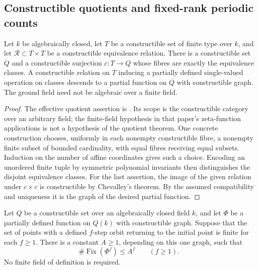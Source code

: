 \subsection{Constructible quotients and fixed-rank periodic counts}

\begin{lemma}
\label{D:effective-constructible-quotient}
Let \(k\) be algebraically closed, let \(T\) be a constructible set
of finite type over \(k\), and let \(\mathcal R\subset T\times T\)
be a constructible equivalence relation. There is a constructible
set \(Q\) and a constructible surjection \(c:T\to Q\) whose fibres
are exactly the equivalence classes. A constructible relation
on \(T\) inducing a partially defined single-valued operation on
classes descends to a partial function on \(Q\) with constructible
graph. The ground field need not be algebraic over a finite field.
\end{lemma}

\begin{proof}
The effective quotient assertion is
\cite[Theorem 2; constructive proof by Proposition 3.1, pp.~10--11]
{Beke2011FixedRankB}. Its scope is the constructible category over
an arbitrary field; the finite-field hypothesis in that paper's
zeta-function applications is not a hypothesis of the quotient
theorem. One concrete construction chooses, uniformly in each
nonempty constructible fibre, a nonempty finite subset of bounded
cardinality, with equal fibres receiving equal subsets. Induction
on the number of affine coordinates gives such a choice. Encoding
an unordered finite tuple by symmetric polynomial invariants
then distinguishes the disjoint equivalence classes.
For the last assertion, the image of the given relation under
\(c\times c\) is constructible by Chevalley's theorem. By the
assumed compatibility and uniqueness it is the graph of the
desired partial function.
\end{proof}

\begin{lemma}
\label{D:constructible-periodic-count}
Let \(Q\) be a constructible set over an algebraically closed field
\(k\), and let \(\Phi\) be a partially defined function on \(Q(k)\)
with constructible graph. Suppose that the set of points with a
defined \(f\)-step orbit returning to the initial point is finite
for each \(f\geq1\). There is a constant \(A\geq1\), depending on
this one graph, such that
\[
 \#\operatorname{Fix}(\Phi^f)\leq A^f\qquad(f\geq1).
 \tag{F1}
\]
No finite field of definition is required.
\end{lemma}

